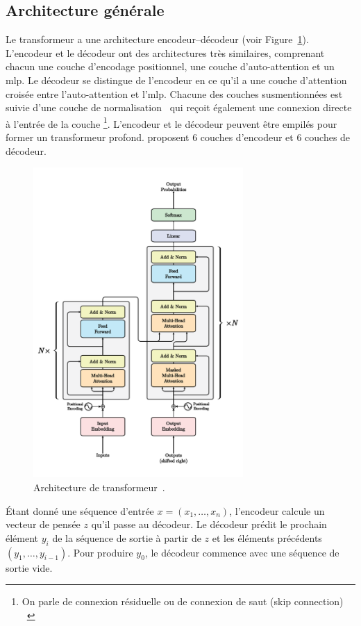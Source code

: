 \subsection{Architecture générale}

Le transformeur a une architecture encodeur--décodeur (voir Figure~\ref{fig.transformer}).
L'encodeur et le décodeur ont des architectures très similaires, 
comprenant chacun une couche d'encodage positionnel, une couche d'auto-attention et un \gls{mlp}.
Le décodeur se distingue de l'encodeur 
en ce qu'il a une couche d'attention croisée entre l'auto-attention et l'\gls{mlp}.
Chacune des couches susmentionnées est suivie d'une couche de normalisation~\cite{Ba_Kiros_Hinton_2016}
qui reçoit également une connexion directe à l'entrée de la couche%
\footnote{%
    On parle de connexion résiduelle ou de connexion de saut \foreignlanguage{english}{(skip connection)}%
    ~\cite{He_Zhang_Ren_Sun_2016}
}.
L'encodeur et le décodeur peuvent être empilés pour former un transformeur profond.
\citeauthor{attention} proposent 6 couches d'encodeur et 6 couches de décodeur.

\begin{figure}[htb]
    \centering
    \includegraphics[width=8cm]{assets/images/transformer.png}
    \caption[L'architecture de transformeur.]
    {Architecture de transformeur~\cite{attention}.}
    \label{fig.transformer}
\end{figure}

Étant donné une séquence d'entrée \(x = (x_1, \ldots, x_n)\),
l'encodeur calcule un vecteur de pensée \(z\) qu'il passe au décodeur.
Le décodeur prédit le prochain élément \(y_i\) de la séquence de sortie 
à partir de \(z\) et les éléments précédents \((y_1, \ldots, y_{i-1})\).
Pour produire \(y_0\), le décodeur commence avec une séquence de sortie vide.
